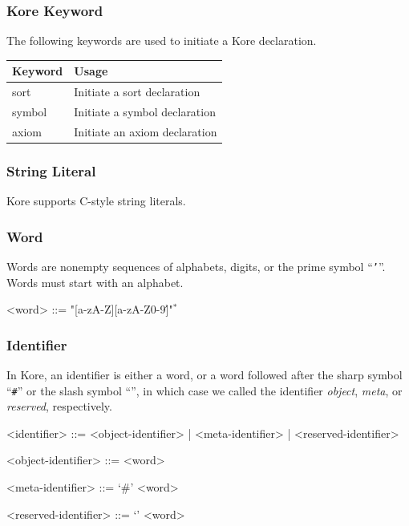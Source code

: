 \documentclass[UTF8,11pt]{article}
\theoremstyle{plain}
\theoremstyle{definition}
\theoremstyle{remark}
\newcommand{\sharpsymbol}{\#}
\newcommand{\slashsymbol}{\symbol{92}}
\begin{document}
\subsubsection{Kore Keyword} 
The following keywords are used to initiate a Kore declaration.
\begin{center}
	{\ttfamily
		\begin{tabular}{l|l}
			\textrm{Keyword} & \textrm{Usage}
			\\\hline
			sort & \textrm{Initiate a sort declaration}
			\\
			symbol & \textrm{Initiate a symbol declaration}
			\\
			axiom & \textrm{Initiate an axiom declaration}
	\end{tabular}}
\end{center}

\subsubsection{String Literal}
Kore supports C-style string literals.

\subsubsection{Word}
Words are nonempty sequences of alphabets, digits, or the prime symbol
``\texttt{'}''.
Words must start with an alphabet.
\begin{grammar}\small\centering
	<word> ::= "[a-zA-Z][a-zA-Z0-9\']"$^*$
\end{grammar}

\subsubsection{Identifier}
In Kore, an identifier is either a word, or a word followed after the sharp 
symbol
``\texttt{\sharpsymbol}'' or the slash symbol ``\texttt{\slashsymbol}'', in 
which case 
we called the identifier \emph{object}, \emph{meta}, or \emph{reserved}, 
respectively.

\begin{grammar}\small
	<identifier>    ::= 	<object-identifier>  | <meta-identifier> | 
	<reserved-identifier>

	<object-identifier> ::= <word> 
		
	<meta-identifier> ::= `\sharpsymbol' <word> 
		
	<reserved-identifier> ::= `\slashsymbol' <word>
\end{grammar}
\end{document}
